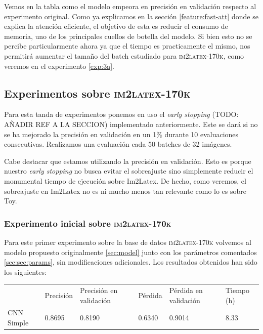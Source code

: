 \documentclass[a4paper, 20pt, dvipsnames]{article}
\begin{document}
Vemos en la tabla como el modelo empeora en precisión en validación respecto al
experimento original. Como ya explicamos en la sección \ref{feature:fast-att}
donde se explica la atención eficiente, el objetivo de esta es reducir el
consumo de memoria, uno de los principales cuellos de botella del modelo. Si
bien esto no se percibe particularmente ahora ya que el tiempo es practicamente
el mismo, nos permitirá aumentar el tamaño del batch estudiado para
\textsc{im2latex-170k}, como veremos en el experimento \ref{exp:3a}.


\subsection{Experimentos sobre \textsc{im2latex-170k}}

Para esta tanda de experimentos ponemos en uso el \emph{early stopping} (TODO: AÑADIR REF
A LA SECCION) implementado anteriormente. Este se dará si no se ha mejorado la precisión
en validación en un 1\% durante 10 evaluaciones consecutivas. Realizamos una evaluación
cada 50 batches de 32 imágenes.

Cabe destacar que estamos utilizando la precisión en validación. Esto es porque nuestro
\emph{early stopping} no busca evitar el sobreajuste sino simplemente reducir el
monumental tiempo de ejecución sobre Im2Latex. De hecho, como veremos, el sobreajuste en
Im2Latex no es ni mucho menos tan relevante como lo es sobre Toy.

\subsubsection{Experimento inicial sobre \textsc{im2latex-170k}}
\label{exp:1}

Para este primer experimento sobre la base de datos \textsc{im2latex-170k}
volvemos al modelo propuesto originalmente \ref{sec:model} junto con los
parámetros comentados \ref{sec:sec:params}, sin modificaciones adicionales. Los
resultados obtenidos han sido los siguientes:

\begin{table}[H]
	\centering
	\begin{tabular}{llllll}
		& Precisión & Precisión en validación & Pérdida & Pérdida en validación & Tiempo (h) \\ \cline{2-6} 
		CNN Simple & 0.8695    & 0.8190                  & 0.6340  & 0.9014                & 8.33      
	\end{tabular}
\end{table}
\end{document}
